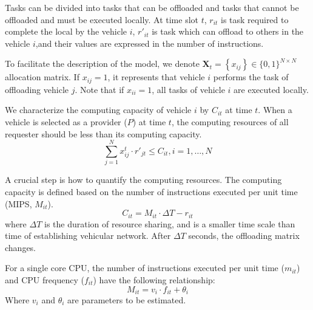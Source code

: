 \documentclass[conference]{IEEEtran}
\begin{document}
Tasks can be divided into tasks that can be offloaded and tasks that cannot be offloaded and must be executed locally.
At time slot $t$, 
$r_ {it}$ is task required to complete the local by the vehicle $i$, 
$r'_ {it}$ is task which can offload to others in the vehicle $i$,and their values are expressed in the number of instructions.

	To facilitate the description of the model, we denote $\mathbf{X}_{t}=\left\{x_{i j}\right\} \in\{0,1\}^{N \times N}$ allocation matrix. If $x_{ij}=1$, it represents that vehicle $i$ performs the task of offloading vehicle $j$. Note that if $x_{ii}=1$, all tasks of vehicle $i$ are executed locally. 

	We characterize the computing capacity of vehicle $i$ by $C_ {it}$ at time $t$. When a vehicle is selected as a provider ($P$) at time $t$, the computing resources of all requester should be less than its computing capacity.
\begin{equation}
	\sum    \limits_{ j= 1} ^{N}
	{ x_{ij}^{t} \cdot  r'_{jt}} \le C_{it}, i = 1, \dots, N
\end{equation}

A crucial step is how to quantify the computing resources. 
The computing capacity is defined based on the number of instructions executed per unit time (MIPS, $M_{it}$). 
\begin{equation}
	C_{it} = M_{it}   \cdot \Delta T 
	- r_{it}
	\label{cm}
\end{equation}
where $\Delta T$ is the duration of resource sharing, and is a smaller time scale than time of establishing vehicular network. After $\Delta T$ seconds, the offloading matrix changes.
%

For a single core CPU, the number of instructions executed per unit time ($m_{it}$) and CPU frequency ($f_{it}$) have the following relationship:
\begin{equation}
	M_{it} = v_i \cdot f_{it} + \theta_i
	\label{mf}
\end{equation}
Where $v_ {i} $ and $\theta_ i$ are parameters to be estimated.
\end{document}
